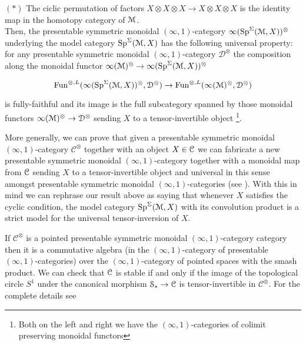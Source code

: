 \begin{refsection}
\begin{thm}
$(*)$ The ciclic permutation of factors $X\otimes X\otimes X\to X\otimes X\otimes X$ is the identity map in the homotopy category of $\mathcal{M}$.\\

Then, the presentable symmetric monoidal $(\infty,1)$-category $\infty(\mathrm{Sp}^{\Sigma}(\mathcal{M}, X))^{\otimes}$ underlying the model category $\mathrm{Sp}^{\Sigma}(\mathcal{M}, X)$ has the following universal property: for any presentable symmetric monoidal $(\infty,1)$-category $\mathcal{D}^{\otimes}$ the composition along the monoidal functor $\infty(\mathcal{M})^{\otimes}\to\infty(\mathrm{Sp}^{\Sigma}(\mathcal{M}, X))^{\otimes}$ 

$$\mathrm{Fun}^{\otimes, L}(\infty(\mathrm{Sp}^{\Sigma}(\mathcal{M}, X))^{\otimes} , \mathcal{D}^{\otimes})\to \mathrm{Fun}^{\otimes, L}(\infty(\mathcal{M})^{\otimes}, \mathcal{D}^{\otimes})$$

\noindent is fully-faithful and its image is the full subcategory spanned by those monoidal functors $\infty(\mathcal{M})^{\otimes}\to \mathcal{D}^{\otimes}$ sending $X$ to a tensor-invertible object \footnote{Both on the left and right we have the $(\infty,1)$-categories of colimit preserving monoidal functors}.
\end{thm}

More generally, we can prove that given a presentable symmetric monoidal $(\infty,1)$-category $\mathcal{C}^{\otimes}$ together with an object $X\in \mathcal{C}$ we can fabricate a new presentable symmetric monoidal $(\infty,1)$-category together with a monoidal map from $\mathcal{C}$ sending $X$ to a tensor-invertible object and universal in this sense amongst presentable symmetric monoidal $(\infty,1)$-categories (see \cite[4.10]{nc1}). With this in mind we can rephrase our result above as saying that whenever $X$ satisfies the cyclic condition, the model category $\mathrm{Sp}^{\Sigma}(\mathcal{M}, X)$ with its convolution product is a strict model for the universal tensor-inversion of $X$.\\


\begin{example}
If $\mathcal{C}^{\otimes}$ is a pointed presentable symmetric monoidal $(\infty,1)$-category category then it is a commutative algebra  (in the $(\infty,1)$-category of presentable $(\infty,1)$-categories) over the $(\infty,1)$-category of pointed spaces with the smash product. We can check that $\mathcal{C}$ is stable if and only if the image of the topological circle $S^1$ under the canonical morphism $\mathcal{S}_{\ast}\to \mathcal{C}$ is tensor-invertible in $\mathcal{C}^{\otimes}$. For the complete details see \cite[4.28]{nc1}
\end{example}


\end{refsection}
